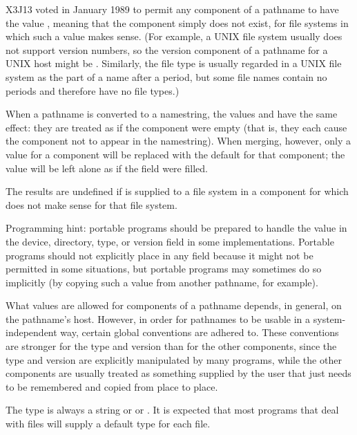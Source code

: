 \begin{newer}
X3J13 voted in January 1989 
to permit any component of a pathname to have the value ,
meaning that the component simply does not exist,
for file systems in which such a value makes sense.
(For example, a UNIX file system usually does not support version numbers,
so the version component of a pathname for a UNIX host might be
.  Similarly,
the file type is usually regarded in a UNIX file system as the part
of a name after a period, but some file names contain no periods and therefore have
no file types.)

  When a pathname is converted to a namestring, the values  and 
  have the same effect: they
  are treated as if the component were empty (that is, they each cause the
  component not to appear in the namestring).
  When merging, however, only a  value for a component will be
  replaced with the default for that component; the value 
  will be left alone as if the field were filled.

  The results are undefined if  is supplied
  to a file system in a component for which
   does not make sense for that file system.

  Programming hint:
  portable programs should be prepared to handle the value  in the device,
  directory, type, or version field in some implementations.
  Portable programs should not explicitly place  in any
  field because it might not be permitted in some situations,
  but portable programs may sometimes do so implicitly (by copying
  such a value from another pathname, for example).
\end{newer}

What values are allowed for components of a pathname depends, in general,
on the pathname's host.  However, in order for pathnames to be usable
in a system-independent way, certain global conventions are adhered to.
These conventions are stronger for the type and version than for the
other components, since the type and version are explicitly manipulated by
many programs, while the other components are usually treated as something
supplied by the user that just needs to be remembered and copied
from place to place.

The type is always a string or {\nil} or .
It is expected that most
programs that deal with files will supply a default type for each file.


